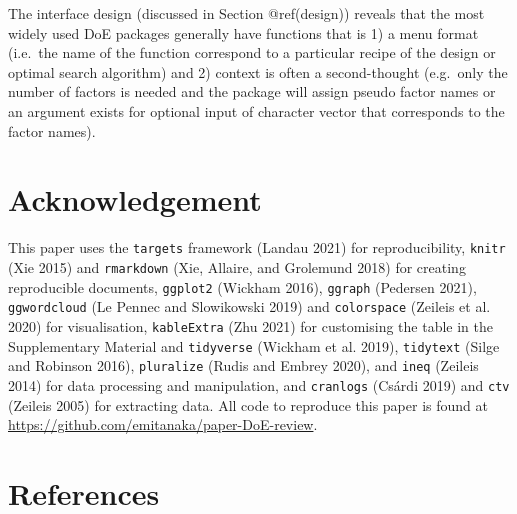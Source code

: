 \documentclass{article}
\begin{document}
The interface design (discussed in Section @ref(design)) reveals that
the most widely used DoE packages generally have functions that is 1) a
menu format (i.e.~the name of the function correspond to a particular
recipe of the design or optimal search algorithm) and 2) context is
often a second-thought (e.g.~only the number of factors is needed and
the package will assign pseudo factor names or an argument exists for
optional input of character vector that corresponds to the factor
names).

\hypertarget{acknowledgement}{%
\section{Acknowledgement}\label{acknowledgement}}

This paper uses the \texttt{targets} framework (Landau 2021) for
reproducibility, \texttt{knitr} (Xie 2015) and \texttt{rmarkdown} (Xie,
Allaire, and Grolemund 2018) for creating reproducible documents,
\texttt{ggplot2} (Wickham 2016), \texttt{ggraph} (Pedersen 2021),
\texttt{ggwordcloud} (Le Pennec and Slowikowski 2019) and
\texttt{colorspace} (Zeileis et al. 2020) for visualisation,
\texttt{kableExtra} (Zhu 2021) for customising the table in the
Supplementary Material and \texttt{tidyverse} (Wickham et al. 2019),
\texttt{tidytext} (Silge and Robinson 2016), \texttt{pluralize} (Rudis
and Embrey 2020), and \texttt{ineq} (Zeileis 2014) for data processing
and manipulation, and \texttt{cranlogs} (Csárdi 2019) and \texttt{ctv}
(Zeileis 2005) for extracting data. All code to reproduce this paper is
found at \url{https://github.com/emitanaka/paper-DoE-review}.

\hypertarget{references}{%
\section*{References}\label{references}}
\end{document}
